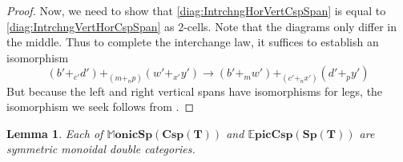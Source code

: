 \documentclass[11pt]{amsart}
\newcommand{\dblmonspcsp}[1]{\mathbb{M}\mathbf{onicSp(Csp(#1))}}
\newcommand{\dblepiccspsp}[1]{\mathbb{E}\mathbf{picCsp(Sp(#1))}}
\newtheorem{lem}[thm]{Lemma}
\theoremstyle{remark}
\theoremstyle{definition}
\begin{document}
\begin{proof}
	Now, we need to show that \eqref{diag:IntrchngHorVertCspSpan} is equal to \eqref{diag:IntrchngVertHorCspSpan} as $2$-cells.  Note that the diagrams only differ in the middle.  Thus to complete the interchange law, it suffices to establish an isomorphism 
	\[
	(b'+_{c'}d') +_{(m+_{n}p)} (w'+_{x'}y')
	\to 
	(b'+_{m}w')+_{(c'+_{n}x')}(d'+_{p}y')
	\]
	But because the left and right vertical spans have isomorphisms for legs, the isomorphism we seek follows from \cite[Lem.~2.5]{Cic}. 
\end{proof}


\begin{lem}
\label{lem:SpanCospanSM}
	Each of $\dblmonspcsp{T}$ and $\dblepiccspsp{T}$ are symmetric monoidal double categories.  
\end{lem}
\end{document}

